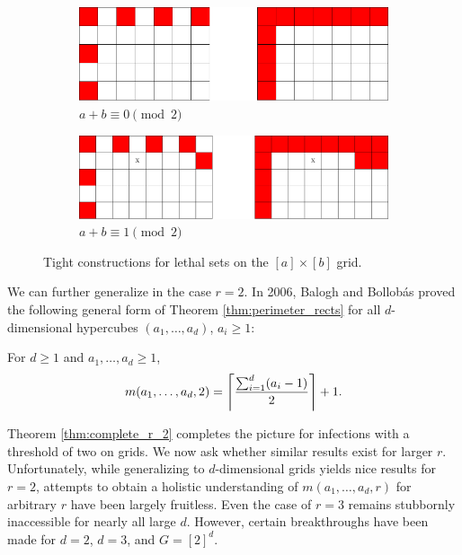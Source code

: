 \begin{figure}[]
\centering
\begin{subfigure}{0.4\textwidth}
	\includegraphics[width=\textwidth]{figures/1/5x7x1.pdf}
	\caption{$a+b \equiv 0 \pmod 2$}
	\label{fig:sa_construction_2d_a}
\end{subfigure} \hfill%
\begin{subfigure}{0.45\textwidth}
	\includegraphics[width=\textwidth]{figures/1/5x8x1.pdf}
	\caption{$a+b \equiv 1 \pmod 2$}
	\label{fig:sa_construction_2d_b}
\end{subfigure}
\caption{Tight constructions for lethal sets on the $[a] \times [b]$ grid.}
\label{fig:sa_construction_2d}
\end{figure} 

We can further generalize in the case $r=2$. In 2006, Balogh and Bollob\'as \cite{balogh:2006} proved the following general form of Theorem \ref{thm:perimeter_rects} for all $d$-dimensional hypercubes $(a_1, \dots, a_d)$, $a_i \geq 1$:

\begin{thm}
\label{thm:complete_r_2}
For $d \geq 1$ and $a_1, \dots, a_d \geq 1$, 
$$m(a_1, \dots, a_d, 2) = \ceil*{\frac{\sum_{i=1}^d (a_i-1)}{2}}+1.$$
\end{thm}

Theorem \ref{thm:complete_r_2} completes the picture for infections with a threshold of two on grids. We now ask whether similar results exist for larger $r$. Unfortunately, while generalizing to $d$-dimensional grids yields nice results for $r=2$, attempts to obtain a holistic understanding of $m(a_1, \dots, a_d, r)$ for arbitrary $r$ have been largely fruitless. Even the case of $r=3$ remains stubbornly inaccessible for nearly all large $d$. However, certain breakthroughs have been made for $d=2$, $d=3$, and $G=[2]^d$.

